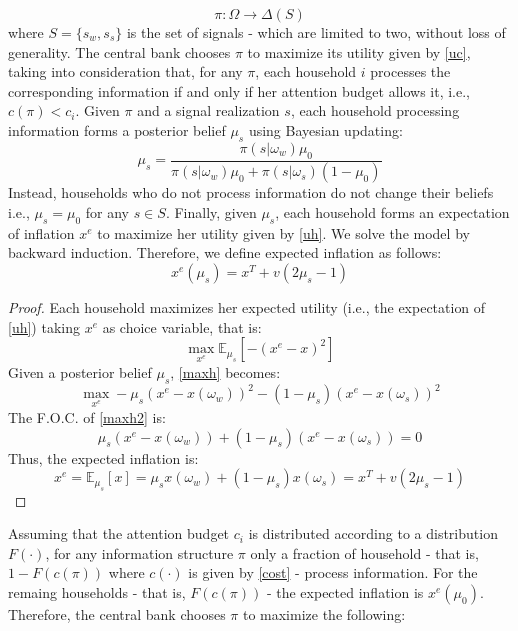 \documentclass[12pt,a4paper]{article}
\begin{document}
\begin{equation}
    \pi \colon \Omega \to \Delta(S)
\end{equation}
where $S=\{s_w,s_s\}$ is the set of signals - which are limited to two, without loss of generality. The central bank chooses $\pi$ to maximize its utility given by \eqref{uc}, taking into consideration that, for any $\pi$, each household $i$ processes the corresponding information if and only if her attention budget allows it, i.e., $c(\pi)< c_i$. Given $\pi$ and a signal realization $s$, each household processing information forms a posterior belief $\mu_s$ using Bayesian updating:
\begin{equation}
     \mu_s = \frac{\pi(s|\omega_w)\mu_0}{\pi(s|\omega_w)\mu_0+\pi(s|\omega_s)(1-\mu_0)}
\end{equation}
Instead, households who do not process information do not change their beliefs i.e., $\mu_s=\mu_0$ for any $s\in S$. Finally, given $\mu_s$, each household forms an expectation of inflation $x^e$ to maximize her utility given by \eqref{uh}. We solve the model by backward induction. Therefore, we define expected inflation as follows:
\begin{equation}
    x^e(\mu_s)=x^T+v(2\mu_s-1)
\end{equation}
\begin{proof}
    Each household maximizes her expected utility (i.e., the expectation of \eqref{uh}) taking $x^e$ as choice variable, that is:
    \begin{equation}
    \label{maxh}
        \max_{x^e}  \mathbb{E}_{\mu_s}\left[-\left(x^e - x\right)^2\right]
    \end{equation}
    Given a posterior belief $\mu_s$, \eqref{maxh} becomes:
    \begin{equation}
    \label{maxh2}
        \max_{x^e}  -\mu_s\left(x^e - x(\omega_w)\right)^2-(1-\mu_s)\left(x^e - x(\omega_s)\right)^2
    \end{equation}
    The F.O.C. of \eqref{maxh2} is:
    \begin{equation*}
        \mu_s\left(x^e - x(\omega_w)\right)+(1-\mu_s)\left(x^e - x(\omega_s)\right)=0
    \end{equation*}
    Thus, the expected inflation is:
    \begin{equation*}
        x^e=\mathbb{E}_{\mu_s}[x]=\mu_sx(\omega_w)+(1-\mu_s)x(\omega_s)=x^T+v(2\mu_s-1)
    \end{equation*}
\end{proof}
Assuming that the attention budget $c_i$ is distributed according to a distribution $F(\cdot)$, for any information structure $\pi$ only a fraction of household - that is, $1-F(c(\pi))$ where $c(\cdot)$ is given by \eqref{cost} - process information. For the remaing households - that is, $F(c(\pi))$ - the expected inflation is $x^e(\mu_0)$. Therefore, the central bank chooses $\pi$ to maximize the following:
\end{document}
